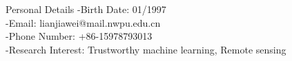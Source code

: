 
\begin{rubric}{Personal Details}
  -Birth Date: 01/1997\\
  -Email: lianjiawei@mail.nwpu.edu.cn\\
  -Phone Number: +86-15978793013\\
  -Research Interest: Trustworthy machine learning, Remote sensing\\
\end{rubric}
